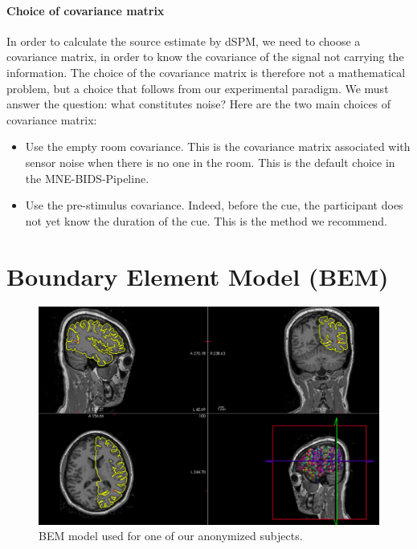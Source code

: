 \paragraph{Choice of covariance matrix}

In order to calculate the source estimate by dSPM, we need to choose a covariance matrix, in order to know the covariance of the signal not carrying the information. The choice of the covariance matrix is therefore not a mathematical problem, but a choice that follows from our experimental paradigm. We must answer the question: what constitutes noise? Here are the two main choices of covariance matrix:
\begin{itemize}
    \item Use the empty room covariance. This is the covariance matrix associated with sensor noise when there is no one in the room. This is the default choice in the MNE-BIDS-Pipeline.
    \item Use the pre-stimulus covariance. Indeed, before the cue, the participant does not yet know the duration of the cue. This is the method we recommend.
\end{itemize}


\section{Boundary Element Model (BEM)}

\begin{figure}[ht]
    \centering
    \includegraphics[width=15cm]{images_report/source/BEM_model_freeview_cropped.png}
    \caption[BEM model used for one of our anonymized subjects.]%
    {BEM model used for one of our anonymized subjects.}
    \label{BEM_model_freeview_cropped}
\end{figure}


